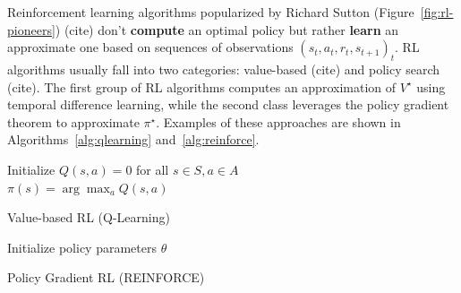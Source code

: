 Reinforcement learning algorithms popularized by Richard Sutton (Figure~\ref{fig:rl-pioneers}) (cite) don't \textbf{compute} an optimal policy but rather \textbf{learn} an approximate one based on sequences of observations ${(s_t, a_t, r_t, s_{t+1})}_t$.
RL algorithms usually fall into two categories: value-based (cite) and policy search (cite).
The first group of RL algorithms computes an approximation of $V^{\star}$ using temporal difference learning, while the second class leverages the policy gradient theorem to approximate $\pi^{\star}$.
Examples of these approaches are shown in Algorithms~\ref{alg:qlearning} and~\ref{alg:reinforce}.

\begin{algorithm}
    Initialize $Q(s,a) = 0$ for all $s \in S, a \in A$ \\
    $\pi(s) = \arg\max_a Q(s,a)$ 
    \caption{Value-based RL (Q-Learning)}\label{alg:qlearning}
\end{algorithm}


\begin{algorithm}
    Initialize policy parameters $\theta$ \\
    \caption{Policy Gradient RL (REINFORCE)}\label{alg:reinforce}
\end{algorithm}


